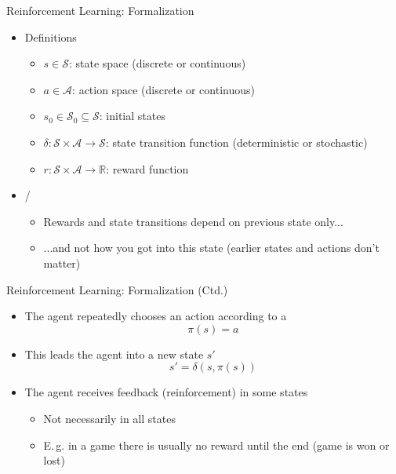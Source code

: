 \begin{frame}{Reinforcement Learning: Formalization}{}
	\begin{itemize}
		\item Definitions
		\begin{itemize}
			\item $s \in \mathcal{S}$: state space (discrete or continuous)
			\item $a \in \mathcal{A}$: action space (discrete or continuous)
			\item $s_0 \in \mathcal{S}_0 \subseteq \mathcal{S}$: initial states
			\item $\delta : \mathcal{S} \times \mathcal{A} \rightarrow \mathcal{S}$: state transition function
				(deterministic or stochastic)
			\item $r : \mathcal{S} \times \mathcal{A} \rightarrow \mathbb{R}$: reward function
		\end{itemize}
		\item {} / 
		\begin{itemize}
			\item Rewards and state transitions depend on previous state only...
			\item ...and not how you got into this state (earlier states and actions don't matter)
		\end{itemize}
	\end{itemize}
\end{frame}


\begin{frame}{Reinforcement Learning: Formalization (Ctd.)}{}
	\begin{itemize}
		\item The agent repeatedly chooses an action according to a 
		\begin{equation}
			\pi(s) = a
		\end{equation}
		\item This leads the agent into a new state $s'$
		\begin{equation}
			s' = \delta(s, \pi(s))
		\end{equation}
		\item The agent receives feedback (reinforcement) in some states
		\begin{itemize}
			\item Not necessarily in all states
			\item E.\,g. in a game there is usually no reward until the end (game is won or lost)
		\end{itemize}
	\end{itemize}
\end{frame}


